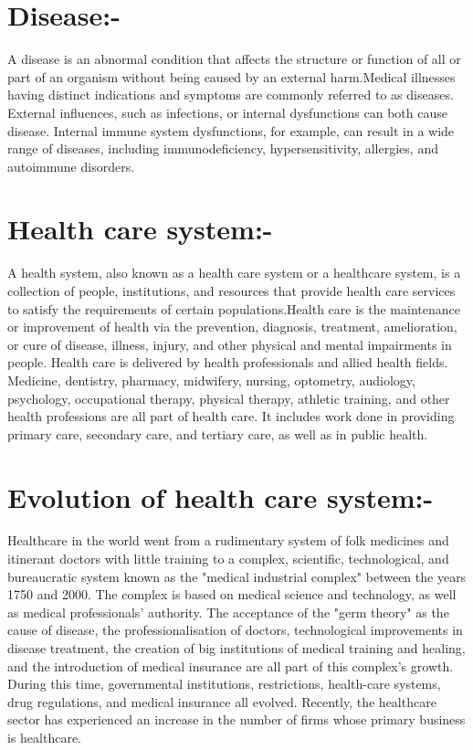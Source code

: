 \documentclass[12pt]{article}
\begin{document}
\section{Disease:-}


A disease is an abnormal condition that affects the structure or function of all or part of an organism without being caused by an external harm.Medical illnesses having distinct indications and symptoms are commonly referred to as diseases. External influences, such as infections, or internal dysfunctions can both cause disease. Internal immune system dysfunctions, for example, can result in a wide range of diseases, including immunodeficiency, hypersensitivity, allergies, and autoimmune disorders.

\section{Health care system:-}

A health system, also known as a health care system or a healthcare system, is a collection of people, institutions, and resources that provide health care services to satisfy the requirements of certain populations.Health care is the maintenance or improvement of health via the prevention, diagnosis, treatment, amelioration, or cure of disease, illness, injury, and other physical and mental impairments in people. Health care is delivered by health professionals and allied health fields. Medicine, dentistry, pharmacy, midwifery, nursing, optometry, audiology, psychology, occupational therapy, physical therapy, athletic training, and other health professions are all part of health care. It includes work done in providing primary care, secondary care, and tertiary care, as well as in public health.

\section{Evolution of health care system:-}

Healthcare in the world went from a rudimentary system of folk medicines and itinerant doctors with little training to a complex, scientific, technological, and bureaucratic system known as the "medical industrial complex" between the years 1750 and 2000. The complex is based on medical science and technology, as well as medical professionals' authority. The acceptance of the "germ theory" as the cause of disease, the professionalisation of doctors, technological improvements in disease treatment, the creation of big institutions of medical training and healing, and the introduction of medical insurance are all part of this complex's growth. During this time, governmental institutions, restrictions, health-care systems, drug regulations, and medical insurance all evolved. Recently, the healthcare sector has experienced an increase in the number of firms whose primary business is healthcare.
\end{document}

